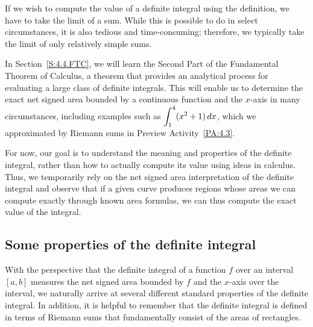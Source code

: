 If we wish to compute the value of a definite integral using the definition, we have to take the limit of a sum.  While this is possible to do in select circumstances, it is also tedious and time-consuming; therefore, we typically take the limit of only relatively simple sums.  




In Section~\ref{S:4.4.FTC}, we will learn the Second Part of the Fundamental Theorem of Calculus, a theorem that provides an analytical process for evaluating a large class of definite integrals.  This will enable us to determine the exact net signed area bounded by a continuous function and the $x$-axis in many circumstances, including examples such as $\displaystyle\int_1^4 (x^2 + 1) \, dx$, which we approximated by Riemann sums in Preview Activity~\ref{PA:4.3}.

For now, our goal is to understand the meaning and properties of the definite integral, rather than how to actually compute its value using ideas in calculus.  Thus, we temporarily rely on the net signed area interpretation of the definite integral and observe that if a given curve produces regions whose areas we can compute exactly through known area formulas, we can thus compute the exact value of the integral.


\subsection*{Some properties of the definite integral}

With the perspective that the definite integral of a function $f$ over an interval $[a,b]$ measures the net signed area bounded by $f$ and the $x$-axis over the interval, we naturally arrive at several different standard properties of the definite integral.  In addition, it is helpful to remember that the definite integral is defined in terms of Riemann sums that fundamentally consist of the areas of rectangles.


